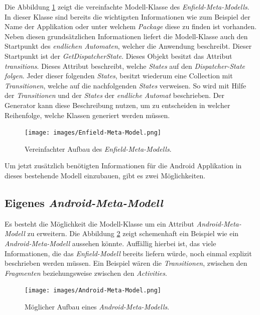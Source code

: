Die Abbildung \ref{fig:enfield-model} zeigt die vereinfachte Modell-Klasse des \textit{Enfield-Meta-Modells}. 
In dieser Klasse sind bereits die wichtigsten Informationen wie zum Beispiel der Name der Applikation oder unter welchem \textit{Package} diese zu finden ist vorhanden. Neben diesen grundsätzlichen Informationen liefert die Modell-Klasse auch den Startpunkt des \textit{endlichen Automaten}, welcher die Anwendung beschreibt. Dieser Startpunkt ist der \textit{GetDispatcherState}. Dieses Objekt besitzt das Attribut \textit{transitions}. Dieses Attribut beschreibt, welche \textit{States} auf den \textit{Dispatcher-State folgen}. Jeder dieser folgenden \textit{States}, besitzt wiederum eine Collection mit \textit{Transitionen}, welche auf die nachfolgenden \textit{States} verweisen. So wird mit Hilfe der \textit{Transitionen} und der \textit{States} der \textit{endliche Automat} beschrieben. Der Generator kann diese Beschreibung nutzen, um zu entscheiden in welcher Reihenfolge, welche Klassen generiert werden müssen.

\begin{figure}[H]
	\begin{center}
		\texttt{[image: images/Enfield-Meta-Model.png]}
		\caption{Vereinfachter Aufbau des \textit{Enfield-Meta-Modells}.}
		\label{fig:enfield-model}
	\end{center}
\end{figure}

Um jetzt zusätzlich benötigten Informationen für die Android Applikation in dieses bestehende Modell einzubauen, gibt es zwei Möglichkeiten.

\subsection{Eigenes \textit{Android-Meta-Modell}}

Es besteht die Möglichkeit die Modell-Klasse um ein Attribut \textit{Android-Meta-Modell} zu erweitern.
Die Abbildung \ref{fig:android-model} zeigt schemenhaft ein Beispiel wie ein \textit{Android-Meta-Modell} aussehen könnte. Auffällig hierbei ist, das viele Informationen, die das \textit{Enfield-Modell} bereits liefern würde, noch einmal explizit beschrieben werden müssen. Ein Beispiel wären die \textit{Transitionen}, zwischen den \textit{Fragmenten} beziehungsweise zwischen den \textit{Activities}. 


\begin{figure}[H]
	\begin{center}
		\texttt{[image: images/Android-Meta-Model.png]}
		\caption{Möglicher Aufbau eines \textit{Android-Meta-Modells}.}
		\label{fig:android-model}
	\end{center}
\end{figure}

